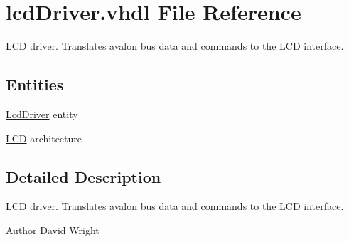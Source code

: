 \hypertarget{lcdDriver_8vhdl}{}\section{lcd\+Driver.\+vhdl File Reference}
\label{lcdDriver_8vhdl}


L\+CD driver. Translates avalon bus data and commands to the L\+CD interface.  


\subsection*{Entities}
\begin{DoxyCompactItemize}
\item 
\hyperlink{classLcdDriver}{Lcd\+Driver} entity
\item 
\hyperlink{classLcdDriver_1_1LCD}{L\+CD} architecture
\end{DoxyCompactItemize}


\subsection{Detailed Description}
L\+CD driver. Translates avalon bus data and commands to the L\+CD interface. 

\begin{DoxyAuthor}{Author}
David Wright 
\end{DoxyAuthor}
